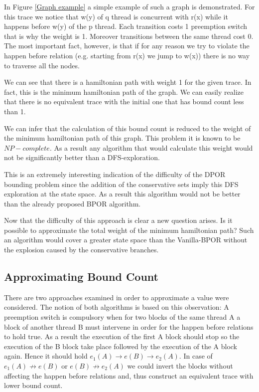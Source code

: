 
In Figure \ref{Graph example} a simple example of such a graph is demonstrated. For this trace we notice that w(y) of q thread is concurrent with r(x) while 
it happens before w(y) of the p thread. Each transition costs 1 preemption switch that is why the weight is 1. Moreover transitions between the same thread cost 0.
The most important fact, however, is that if for any reason we try to violate the happen before relation (e.g. starting from r(x) we jump to w(x)) there is no way to 
traverse all the nodes. 

We can see that there is a hamiltonian path with weight 1 for the given trace. In fact, this is the minimum hamiltonian path of the graph. We can easily realize that 
there is no equivalent trace with the initial one that has bound count less than 1. 

We can infer that the calculation of this bound count is reduced to the weight of the minimum hamiltonian path of this graph. This problem it is known to be $NP-complete$. 
As a result any algorithm that would calculate this weight would not be significantly better than a DFS-exploration. 

This is an extremely interesting indication of the difficulty of the DPOR bounding problem since the addition of the conservative sets imply this DFS
exploration at the state space. As a result this algorithm would not be better than the already proposed BPOR algorithm.

Now that the difficulty of this approach is clear a new question arises. Is it possible to approximate the total weight of the minimum hamiltonian path?
Such an algorithm would cover a greater state space than the Vanilla-BPOR without the explosion caused by the conservative branches.

\subsection{Approximating Bound Count}
There are two approaches examined in order to approximate a value were considered. The notion of both algorithms is based on this observation: A preemption switch is compulsory
when for two blocks of the same thread A a block of another thread B must intervene in order for the happen before relations to hold true. As a result the execution of 
the first A block should stop so the execution of the B block take place followed by the execution of the A block again. Hence it should hold $e_1(A) \rightarrow e(B) \rightarrow e_2(A)$.
In case of $e_1(A) \not \rightarrow e(B)$ or $e(B) \not \rightarrow e_2(A)$ we could invert the blocks without affecting the happen before relations and, thus construct an
equivalent trace with lower bound count.


